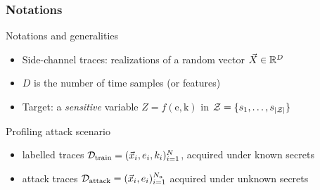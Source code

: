 \begin{frame}
\frametitle{Notations}
\begin{block}{Notations and generalities}
\begin{itemize}
\item Side-channel traces: realizations of a random vector $\vec{X} \in \mathbb{R}^D$  
\item $D$ is the number of time samples (or features)
\item Target: a \emph{sensitive} variable $Z = f(\mathrm{e,k})$ in $\mathcal{Z} = \{s_{1}, \dots, s_{|\mathcal{Z}|}\}$
\end{itemize}
\end{block}
\vspace{-5pt}
\begin{block}{Profiling attack scenario}
\begin{itemize}
\item labelled traces $\mathcal{D}_{\text{train}} = (\vec{x}_i, e_i, k_i)_{i=1}^N$, acquired under known secrets
\item attack traces $\mathcal{D}_{\text{attack}} = (\vec{x}_i, e_i)_{i=1}^{N_a}$ acquired under unknown secrets
\end{itemize}
\end{block}
\end{frame}




